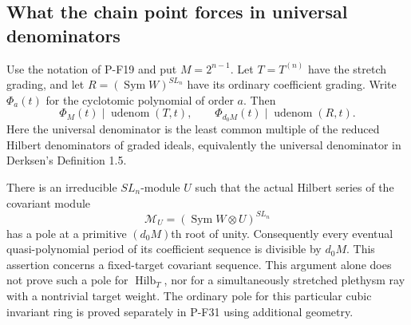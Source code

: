 \subsection{What the chain point forces in universal denominators}

\begin{proposition}
\label{prop:chainuniversaldenominator}
Use the notation of P-F19 and put $M=2^{n-1}$.
Let $T=T^{(n)}$ have the stretch grading, and let
$R=(\operatorname{Sym}W)^{SL_n}$ have its ordinary coefficient grading.
Write $\Phi_a(t)$ for the cyclotomic polynomial of order $a$.
Then
\[
 \Phi_M(t)\mid\operatorname{udenom}(T,t),\qquad
 \Phi_{d_0M}(t)\mid\operatorname{udenom}(R,t).
 \tag{P-F20a}
\]
Here the universal denominator is the least common multiple of the
reduced Hilbert denominators of graded ideals, equivalently the
universal denominator in Derksen's Definition 1.5.

There is an irreducible $SL_n$-module $U$ such that the actual Hilbert
series of the covariant module
\[
 \mathcal M_U=(\operatorname{Sym}W\otimes U)^{SL_n}
 \tag{P-F20b}
\]
has a pole at a primitive $(d_0M)$th root of unity.
Consequently every eventual quasi-polynomial period of its coefficient
sequence is divisible by $d_0M$.
This assertion concerns a fixed-target covariant sequence. This
argument alone does not prove such a pole for $\operatorname{Hilb}_T$,
nor for a simultaneously stretched plethysm ray with a nontrivial
target weight. The ordinary pole for this particular cubic invariant
ring is proved separately in P-F31 using additional geometry.
\end{proposition}

